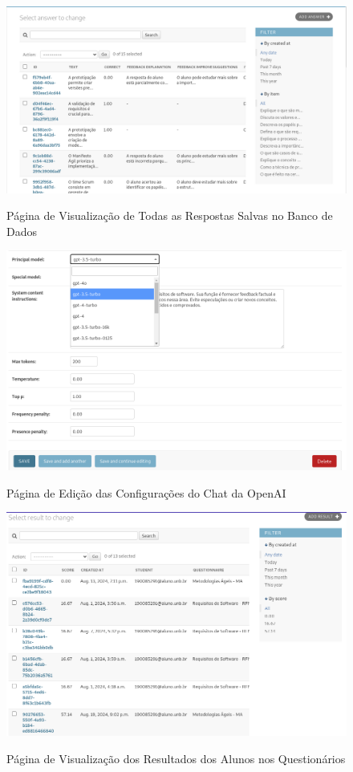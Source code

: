 \begin{figure}[H]
    \centering
    \caption{Página de Visualização de Todas as Respostas Salvas no Banco de Dados}
    \includegraphics[width=1\textwidth]{figuras/admin1.png}
    \label{fig:report_questions}
\end{figure}

\begin{figure}[H]
    \centering
    \caption{Página de Edição das Configurações do Chat da OpenAI}
    \includegraphics[width=1\textwidth]{figuras/admin2.png}
    \label{fig:report_questions}
\end{figure}

\begin{figure}[H]
    \centering
    \caption{Página de Visualização dos Resultados dos Alunos nos Questionários}
    \includegraphics[width=1\textwidth]{figuras/admin3.png}
    \label{fig:report_questions}
\end{figure}

